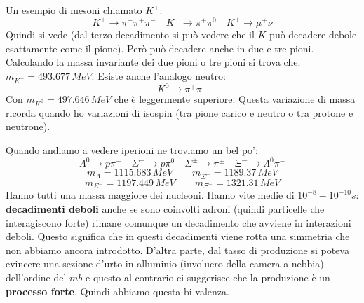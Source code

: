 Un esempio di mesoni chiamato $K^+$:
\begin{equation*}
    K^+\to \pi^+\pi^+\pi^-\quad K^+\to \pi^+\pi^0 \quad K^+\to \mu^+\nu
\end{equation*}
Quindi si vede (dal terzo decadimento si può vedere che il $K$ può decadere debole esattamente come il pione). Però può decadere anche in due e tre pioni. Calcolando la massa invariante dei due pioni o tre pioni si trova che: $m_{K^+}=493.677\,MeV$. Esiste anche l'analogo neutro:
\begin{equation*}
    K^0\to \pi^+\pi^-
\end{equation*}
Con $m_{K^0}=497.646\,MeV$ che è leggermente superiore. Questa variazione di massa ricorda quando ho variazioni di isospin (tra pione carico e neutro o tra protone e neutrone).

Quando andiamo a vedere iperioni  ne troviamo un bel po':
\begin{equation*}
    \Lambda^0\to p\pi^- \quad \Sigma^+\to p\pi^0 \quad \Sigma^\pm\to \pi^{\pm}\quad \Xi^-\to \Lambda^0\pi^-
\end{equation*}
\begin{equation*}
    m_\Lambda=1115.683\,MeV \qquad m_{\Sigma^+}=1189.37\,MeV
\end{equation*}
\begin{equation*}
    m_{\Sigma^-}=1197.449\,MeV \qquad m_{\Xi^-}=1321.31\,MeV
\end{equation*}
Hanno tutti una massa maggiore dei nucleoni. Hanno vite medie di $10^{-8}-10^{-10}s$: \textbf{decadimenti deboli} anche se sono coinvolti adroni (quindi particelle che interagiscono forte) rimane comunque un decadimento che avviene in interazioni deboli. Questo significa che in questi decadimenti viene rotta una simmetria che non abbiamo ancora introdotto. D'altra parte, dal tasso di produzione si poteva evincere una sezione d'urto in alluminio (involucro della camera a nebbia) dell'ordine del $mb$ e questo al contrario ci suggerisce che la produzione è un \textbf{processo forte}. Quindi abbiamo questa bi-valenza.
